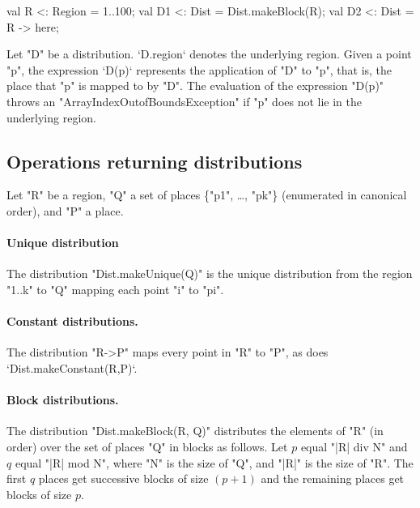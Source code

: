 \begin{xten}
val R  <: Region = 1..100;
val D1 <: Dist = Dist.makeBlock(R);
val D2 <: Dist = R -> here;
\end{xten}

Let \xcd"D" be a distribution. 
\xcd`D.region` 
denotes the underlying
region. 
Given a point \xcd"p", the expression
\xcd`D(p)` represents the application of \xcd"D" to \xcd"p", that is,
the place that \xcd"p" is mapped to by \xcd"D". The evaluation of the
expression \xcd"D(p)" throws an \xcd"ArrayIndexOutofBoundsException"
if \xcd"p" does not lie in the underlying region.


\subsection{Operations returning distributions}

Let \xcd"R" be a region, \xcd"Q" a set of places \{\xcd"p1", \dots, \xcd"pk"\}
(enumerated in canonical order), and \xcd"P" a place.  

\paragraph{Unique distribution} 
The distribution \xcd"Dist.makeUnique(Q)" is the unique distribution from the
region \xcd"1..k" to \xcd"Q" mapping each point \xcd"i" to \xcd"pi".

\paragraph{Constant distributions.} 
The distribution \xcd"R->P" maps every point in \xcd"R" to \xcd"P", as does
\xcd`Dist.makeConstant(R,P)`. 

\paragraph{Block distributions.}
The distribution \xcd"Dist.makeBlock(R, Q)" distributes the elements of \xcd"R"
(in order) over the set of places \xcd"Q" in blocks  as
follows. Let $p$ equal \xcd"|R| div N" and $q$ equal \xcd"|R| mod N",
where \xcd"N" is the size of \xcd"Q", and 
\xcd"|R|" is the size of \xcd"R".  The first $q$ places get
successive blocks of size $(p+1)$ and the remaining places get blocks of
size $p$.

